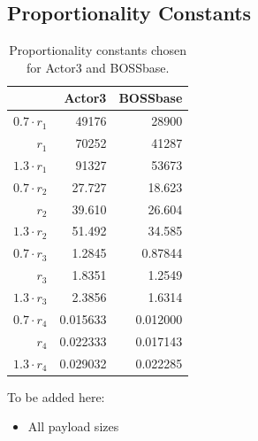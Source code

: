 \documentclass[11pt,a4paper,twoside,openright]{report}
\begin{document}
\begin{appendices}

\chapter{} \label{appendix:payload-sizes}

\section{Proportionality Constants} \label{appendix:prop-constants}

\begin{table}[htbp]
    \begin{center}
        \begin{tabular}{ r | r  r}
        & Actor3 & BOSSbase \\ \hline
        $0.7 \cdot r_1$ & 49176 & 28900 \\
        $r_1$ & 70252 & 41287 \\
        $1.3 \cdot r_1$ & 91327 & 53673 \\ \hline
        $0.7 \cdot r_2$ & 27.727 & 18.623 \\
        $r_2$ & 39.610 & 26.604 \\
        $1.3 \cdot r_2$ & 51.492 & 34.585 \\ \hline
        $0.7 \cdot r_3$ & 1.2845 & 0.87844 \\
        $r_3$ & 1.8351 & 1.2549 \\
        $1.3 \cdot r_3$ & 2.3856 & 1.6314 \\ \hline
        $0.7 \cdot r_4$ & 0.015633 & 0.012000 \\
        $r_4$ & 0.022333 & 0.017143 \\
        $1.3 \cdot r_4$ & 0.029032 & 0.022285 \\
        \end{tabular}
        \caption{Proportionality constants chosen for Actor3 and BOSSbase.}
    \end{center}
\end{table}

To be added here:
\begin{itemize}
    \item All payload sizes
\end{itemize}

\end{appendices}
\end{document}
